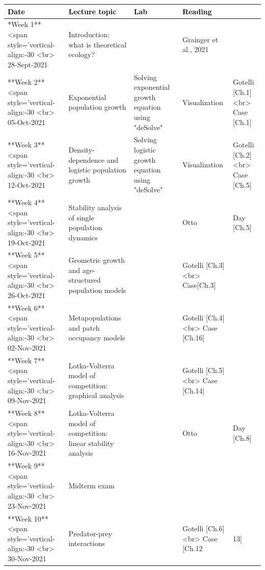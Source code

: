 \documentclass[
]{book}
\begin{document}
\begin{tabu} to 
\hline
\begingroup\fontsize{20}{22}\selectfont \textcolor{black}{\textbf{Date}}\endgroup & \begingroup\fontsize{20}{22}\selectfont \textcolor{black}{\textbf{Lecture topic}}\endgroup & \begingroup\fontsize{20}{22}\selectfont \textcolor{black}{\textbf{Lab}}\endgroup & \begingroup\fontsize{20}{22}\selectfont \textcolor{black}{\textbf{Reading}}\endgroup\\
\hline
**Week 1** <span style='vertical-align:-30%
           <br> 28-Sept-2021 & Introduction: what is theoretical ecology? & \- & Grainger et al., 2021\\
\hline
**Week 2** <span style='vertical-align:-30%
           <br> 05-Oct-2021 & Exponential population growth & Solving exponential growth equation using "deSolve" & Visualization & Gotelli [Ch.1] <br> Case [Ch.1]\\
\hline
**Week 3** <span style='vertical-align:-30%
           <br> 12-Oct-2021 & Density-dependence and logistic population growth & Solving logistic growth equation using "deSolve" & Visualization & Gotelli [Ch.2] <br> Case [Ch.5]\\
\hline
**Week 4** <span style='vertical-align:-30%
           <br> 19-Oct-2021 & Stability analysis of single population dynamics &  & Otto & Day [Ch.5]\\
\hline
**Week 5** <span style='vertical-align:-30%
           <br> 26-Oct-2021 & Geometric growth and age-structured population models &  & Gotelli [Ch.3] <br> Case[Ch.3]\\
\hline
**Week 6** <span style='vertical-align:-30%
           <br> 02-Nov-2021 & Metapopulations and patch occupancy models &  & Gotelli [Ch.4] <br> Case [Ch.16]\\
\hline
**Week 7** <span style='vertical-align:-30%
           <br> 09-Nov-2021 & Lotka-Volterra model of competition: graphical analysis &  & Gotelli [Ch.5] <br> Case [Ch.14]\\
\hline
**Week 8** <span style='vertical-align:-30%
           <br> 16-Nov-2021 & Lotka-Volterra model of competition: linear stability analysis &  & Otto & Day [Ch.8]\\
\hline
**Week 9** <span style='vertical-align:-30%
           <br> 23-Nov-2021 & Midterm exam &  & \\
\hline
**Week 10** <span style='vertical-align:-30%
           <br> 30-Nov-2021 & Predator-prey interactions &  & Gotelli [Ch.6] <br> Case [Ch.12 & 13]\\

\end{tabu}
\end{document}
